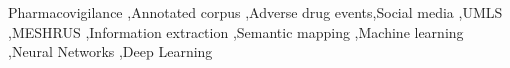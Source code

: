 \documentclass[a4paper,fleqn,longmktitle]{cas-dc}
\begin{document}
\begin{abstract}

\end{abstract}



\begin{keywords}
Pharmacovigilance \sep Annotated corpus \sep Adverse drug events\sep Social media \sep UMLS \sep MESHRUS \sep Information extraction \sep Semantic mapping \sep Machine learning \sep Neural Networks \sep Deep Learning

\end{keywords}


\maketitle
\end{document}
